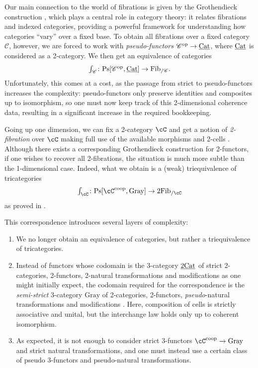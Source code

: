 \documentclass[11pt, dvipsnames]{amsart}
\begin{document}
Our main connection to the world of fibrations is given by the Grothendieck construction \cite{grothendieck}, which plays a central role in category theory: it relates fibrations and indexed categories, providing a powerful framework for understanding how categories ``vary'' over a fixed base. To obtain all fibrations over a fixed category $\mathscr{C}$, however, we are forced to work with \emph{pseudo-functors} $\mathscr{C}^{\mathrm{op}}\to\underline{\mathrm{Cat}}$, where $\underline{\mathrm{Cat}}$ is considered as a 2-category.
We then get an equivalence of categories   
\[\textstyle\int_\mathscr{C}\colon \mathrm{Ps}[\mathscr{C}^{\mathrm{op}},\underline{\mathrm{Cat}}]\to\mathrm{Fib}_{/\mathscr{C}}.\]
 Unfortunately, this comes at a cost, as the passage from strict to pseudo-functors increases the complexity: pseudo-functors only preserve identities and composites up to isomorphism, so one must now keep track of  this 2-dimensional coherence data, resulting in a significant increase in the required bookkeeping.

 Going up one dimension, we can fix a 2-category $\cC$  and get a notion of \emph{2-fibration} over $\cC$ 
making full use of the available morphisms and 2-cells 
\cite{grothcat1,Buckley2014,grothcat3}. 
Although there exists a corresponding Grothendieck construction for 2-functors, if one wishes to recover all 2-fibrations, the situation is much more subtle than the 1-dimensional case. Indeed, what we obtain is a (weak) triequivalence of tricategories
\begingroup\renewcommand{\theequation}{\thesection.\arabic{equation}}%
\begin{equation}\label{eq.intro} \textstyle\int_\cC\colon \mathrm{Ps}[\cC^\coop,\mathrm{Gray}]\to\mathrm{2Fib}_{/\cC}\end{equation} as proved in \cite[Theorem 3.3.12, Remark 3.3.13]{Buckley2014}.
\endgroup

This correspondence introduces several layers of complexity:
\begin{enumerate}[leftmargin=*]
\item\label{one} We no longer obtain an equivalence of categories, but rather a triequivalence of tricategories.
    \item\label{two} Instead of functors whose codomain is the 3-category $\underline{2\mathrm{Cat}}$ of strict 2-categories,  2-functors, 2-natural transformations and modifications as one might initially expect, the codomain required for the correspondence is the \emph{semi-strict} 3-category $\mathrm{Gray}$ of 2-categories,  2-functors,  \emph{pseudo}-natural transformations and modifications \cite{graycats}.  Here, composition of cells is strictly associative and unital, but the interchange law holds only up to coherent isomorphism.
    \item\label{three} As expected, it is not enough to consider strict 3-functors $\cC^\coop\to\mathrm{Gray}$ and strict natural transformations, and one must instead use a certain class of pseudo 3-functors and pseudo-natural transformations.
\end{enumerate}
\end{document}
